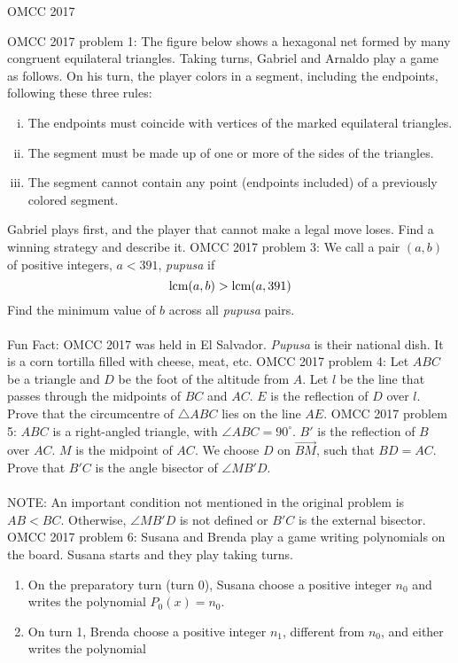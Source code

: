 OMCC 2017 

OMCC 2017 problem 1:  The figure below shows a hexagonal net formed by many congruent equilateral triangles. Taking turns, Gabriel and Arnaldo play a game as follows. On his turn, the player colors in a segment, including the endpoints, following these three rules:
\begin{enumerate}[i)]
  \item The endpoints must coincide with vertices of the marked equilateral triangles.
  \item The segment must be made up of one or more of the sides of the triangles.
  \item The segment cannot contain any point (endpoints included) of a previously colored segment.
\end{enumerate}
Gabriel plays first, and the player that cannot make a legal move loses. Find a winning strategy and describe it. 
OMCC 2017 problem 3:  We call a pair $(a,b)$ of positive integers, $a<391$, \textit{pupusa} if
\[ \textup{lcm}(a,b)>\textup{lcm}(a,391) \]
Find the minimum value of $b$ across all \textit{pupusa} pairs. \\\\
Fun Fact: OMCC 2017 was held in El Salvador. \textit{Pupusa} is their national dish. It is a corn tortilla filled with cheese, meat, etc. 
OMCC 2017 problem 4:  Let $ABC$ be a triangle and $D$ be the foot of the altitude from $A$. Let $l$ be the line that passes through the midpoints of $BC$ and $AC$. $E$ is the reflection of $D$ over $l$. Prove that the circumcentre of $\triangle ABC$ lies on the line $AE$. 
OMCC 2017 problem 5:  $ABC$ is a right-angled triangle, with $\angle ABC = 90^{\circ}$. $B'$ is the reflection of $B$ over $AC$. $M$ is the midpoint of $AC$. We choose $D$ on $\overrightarrow{BM}$, such that $BD = AC$. Prove that $B'C$ is the angle bisector of $\angle MB'D$. \\\\
NOTE: An important condition not mentioned in the original problem is $AB<BC$. Otherwise, $\angle MB'D$ is not defined or $B'C$ is the external bisector. 
OMCC 2017 problem 6:  Susana and Brenda play a game writing polynomials on the board. Susana starts and they play taking turns.
\begin{enumerate}[1)]
  \item On the preparatory turn (turn 0), Susana choose a positive integer $n_0$ and writes the polynomial $P_0(x)=n_0$.
  \item On turn 1, Brenda choose a positive integer $n_1$, different from $n_0$, and either writes the polynomial
\end{enumerate}

